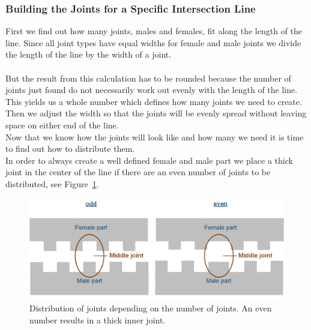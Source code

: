 \documentclass[../ClassicThesis.tex]{subfiles}
\begin{document}
\subsubsection*{Building the Joints for a Specific Intersection Line}
First we find out how many joints, males and females, fit along the length of the line.
Since all joint types have equal widths for female and male joints we divide the length of the line by the width of a joint.\\
\*\\
But the result from this calculation has to be rounded because the number of joints just found do not necessarily work out evenly with the length of the line. This yields us a whole number which defines how many joints we need to create. Then we adjust the width so that the joints will be evenly spread without leaving space on either end of the line.\\
Now that we know how the joints will look like and how many we need it is time to find out how to distribute them.\\
In order to always create a well defined female and male part we place a thick joint in the center of the line if there are an even number of joints to be distributed, see Figure~\ref{fig:evenOddCount}.\\
\begin{figure}[!ht]
\centering
\includegraphics[width=\columnwidth]{Images/10-joints-evenOddJointsCount.png}
\caption{Distribution of joints depending on the number of joints. An even number results in a thick inner joint.}
\label{fig:evenOddCount}
\end{figure}
\end{document}
